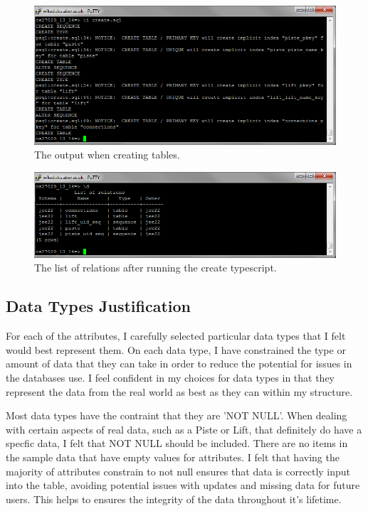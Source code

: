 \documentclass[11pt]{scrartcl} %
\begin{document}


\begin{figure}[H]
  \centering
    \includegraphics[width=1\textwidth]{IMG/create_tables.png}
 \caption{The output when creating tables.}
\end{figure}
\begin{figure}[H]
  \centering
    \includegraphics[width=1\textwidth]{IMG/completed_tables.png}
 \caption{The list of relations after running the create typescript.}
\end{figure}

\subsection{Data Types Justification}
For each of the attributes, I carefully selected particular data types that I felt would best represent them. On each data type, I have constrained the type or amount of data that they can take in order to reduce the potential for issues in the databases use. I feel confident in my choices for data types in that they represent the data from the real world as best as they can within my structure.

Most data types have the contraint that they are 'NOT NULL'. When dealing with certain aspects of real data, such as a Piste or Lift, that definitely do have a specfic data, I felt that NOT NULL should be included. There are no items in the sample data that have empty values for attributes. I felt that having the majority of attributes constrain to not null ensures that data is correctly input into the table, avoiding potential issues with updates and missing data for future users. This helps to ensures the integrity of the data throughout it's lifetime.
\end{document}

